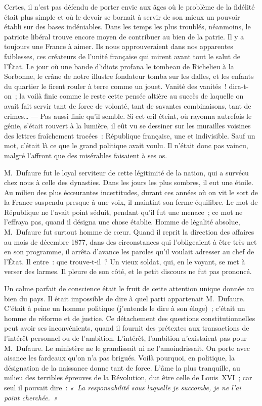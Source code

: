 \documentclass[french,twoside]{book} %
\newcommand\orgName[1]{#1}
\newcommand\persName[1]{#1}
\begin{document}
Certes, il n’est pas défendu de porter envie aux âges où le problème de la fidélité était plus simple et où le devoir se bornait à servir de son mieux un pouvoir établi sur des bases indéniables. Dans les temps les plus troublés, néanmoins, le patriote libéral trouve encore moyen de contribuer au bien de la patrie. Il y a toujours une {\orgName France} à aimer. Ils nous approuveraient dans nos apparentes faiblesses, ces créateurs de l’unité française qui mirent avant tout le salut de l’{\orgName État}. Le jour où une bande d’idiots profana le tombeau de {\persName Richelieu} à la {\orgName Sorbonne}, le crâne de notre illustre fondateur tomba sur les dalles, et les enfants du quartier le firent rouler à terre comme un jouet. Vanité des vanités ! dira-t-on ; la voilà finie comme le reste cette pensée altière au succès de laquelle on avait fait servir tant de force de volonté, tant de savantes combinaisons, tant de crimes… — Pas aussi finie qu’il semble. Si cet œil éteint, où rayonna autrefois le génie, s’était rouvert à la lumière, il eût vu se dessiner sur les murailles voisines des lettres fraîchement tracées : République française, une et indivisible. Sauf un mot, c’était là ce que le grand politique avait voulu. Il n’était donc pas vaincu, malgré l’affront que des misérables faisaient à ses os.\par
{\persName M. Dufaure} fut le loyal serviteur de cette légitimité de la nation, qui a survécu chez nous à celle des dynasties. Dans les jours les plus sombres, il eut une étoile. Au milieu des plus écœurantes incertitudes, durant ces années où on vit le sort de la {\orgName France} suspendu presque à une voix, il maintint son ferme équilibre. Le mot de République ne l’avait point séduit, pendant qu’il fut une menace ; ce mot ne l’effraya pas, quand il désigna une chose établie. Homme de légalité absolue, {\persName M. Dufaure} fut surtout homme de cœur. Quand il reprit la direction des affaires au mois de décembre 1877, dans des circonstances qui l’obligeaient à être très net en son programme, il arrêta d’avance les paroles qu’il voulait adresser au {\persName chef de l’État}. Il entre : que trouve-t-il ? Un vieux soldat, qui, en le voyant, se met à verser des larmes. Il pleure de son côté, et le petit discours ne fut pas prononcé.\par
Un calme parfait de conscience était le fruit de cette attention unique donnée au bien du pays. Il était impossible de dire à quel parti appartenait {\persName M. Dufaure}. C’était à peine un homme politique (j’entends le dire à son éloge) ; c’était un homme de réforme et de justice. Ce détachement des questions constitutionnelles peut avoir ses inconvénients, quand il fournit des prétextes aux transactions de l’intérêt personnel ou de l’ambition. L’intérêt, l’ambition n’existaient pas pour {\persName M. Dufaure}. Le ministère ne le grandissait ni ne l’amoindrissait. On porte avec aisance les fardeaux qu’on n’a pas brigués. Voilà pourquoi, en politique, la désignation de la naissance donne tant de force. L’âme la plus tranquille, au milieu des terribles épreuves de la Révolution, dut être celle de {\persName Louis XVI} ; car seul il pouvait dire : \emph{« La responsabilité sous laquelle je succombe, je ne l’ai point cherchée. »}\par
\end{document}
